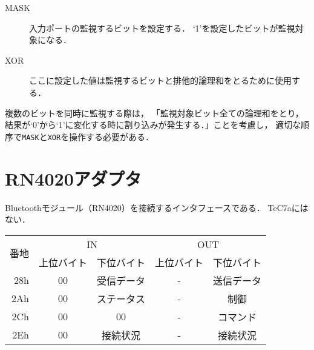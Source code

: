 \begin{description}
\item[MASK]
  入力ポートの監視するビットを設定する．
  `1'を設定したビットが監視対象になる．
\item[XOR]
  ここに設定した値は監視するビットと排他的論理和をとるために使用する．
\end{description}

複数のビットを同時に監視する際は，
「監視対象ビット全ての論理和をとり，
結果が`0'から`1'に変化する時に割り込みが発生する．」ことを考慮し，
適切な順序で\texttt{MASK}と\texttt{XOR}を操作する必要がある．

\section{RN4020アダプタ}
Bluetoothモジュール（RN4020）を接続するインタフェースである．
TeC7aにはない．

\begin{center}
  \small\begin{tabular}{| r | c | c || c | c |}\hline
    \multirow{2}{*}{番地}
    & \multicolumn{2}{c||}{IN}
    & \multicolumn{2}{c|}{OUT}
    \\\cline{2-5}
         & 上位バイト & 下位バイト & 上位バイト & 下位バイト
    \\\hline\hline
    28h  &  00 & 受信データ
         &  -  & 送信データ \\\hline
    2Ah  &  00 & ステータス
         &  -  & 制御 \\\hline
    2Ch  &  00 & 00
         &  -  & コマンド \\\hline
    2Eh  &  00 & 接続状況
         &  -  & 接続状況 \\\hline
  \end{tabular}
\end{center}

